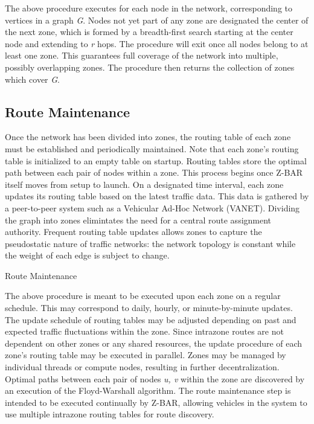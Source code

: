 \documentclass[conference]{IEEEtran}
\begin{document}

The above procedure executes for each node in the network, corresponding to vertices in a graph \textit{G}. Nodes not yet part of any zone are designated the center of the next zone, which is formed by a breadth-first search starting at the center node and extending to \textit{r} hops. The procedure will exit once all nodes belong to at least one zone. This guarantees full coverage of the network into multiple, possibly overlapping zones. The procedure then returns the collection of zones which cover \textit{G}.

\subsection{Route Maintenance}

Once the network has been divided into zones, the routing table of each zone must be established and periodically maintained. Note that each zone's routing table is initialized to an empty table on startup. Routing tables store the optimal path between each pair of nodes within a zone. This process begins once Z-BAR itself moves from setup to launch. On a designated time interval, each zone updates its routing table based on the latest traffic data. This data is gathered by a peer-to-peer system such as a Vehicular Ad-Hoc Network (VANET). Dividing the graph into zones elimintates the need for a central route assignment authority. Frequent routing table updates allows zones to capture the pseudostatic nature of traffic networks: the network topology is constant while the weight of each edge is subject to change.

\begin{algorithm}[H]
  \caption{Route Maintenance}
  \label{route_maintenance}
  \begin{algorithmic}[1]
  \EndFor
  \EndProcedure
  \end{algorithmic}
\end{algorithm}

The above procedure is meant to be executed upon each zone on a regular schedule. This may correspond to daily, hourly, or minute-by-minute updates. The update schedule of routing tables may be adjusted depending on past and expected traffic fluctuations within the zone. Since intrazone routes are not dependent on other zones or any shared resources, the update procedure of each zone's routing table may be executed in parallel. Zones may be managed by individual threads or compute nodes, resulting in further decentralization. Optimal paths between each pair of nodes \textit{u, v} within the zone are discovered by an execution of the Floyd-Warshall algorithm. The route maintenance step is intended to be executed continually by Z-BAR, allowing vehicles in the system to use multiple intrazone routing tables for route discovery.
\end{document}
